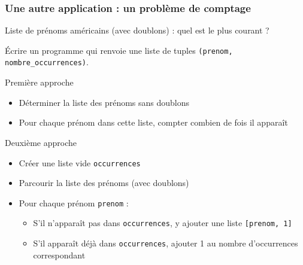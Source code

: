 \documentclass[x11names,svgnames]{beamer}
\begin{document}
\begin{frame}
  \frametitle{Une autre application : un problème de comptage}
  
  Liste de prénoms américains (avec doublons) : quel est le plus courant ?

  \MVRightarrow{} Écrire un programme qui renvoie une liste de tuples \texttt{(prenom, nombre_occurrences)}.

  \vspace{-1em}

  \pause

  \begin{overprint}
    \begin{block}{Première approche}
      \vspace{0.5em}
    \begin{itemize}
    \item Déterminer la liste des prénoms sans doublons
    \item Pour chaque prénom dans cette liste, compter combien de fois il apparaît
    \end{itemize}
  \end{block}
  \begin{block}{Deuxième approche}
    \vspace{0.5em}
    \begin{itemize}
    \item Créer une liste vide \texttt{occurrences}
    \item Parcourir la liste des prénoms (avec doublons)
    \item Pour chaque prénom \texttt{prenom} :
      \begin{itemize}
      \item S'il n'apparaît pas dans \texttt{occurrences}, y ajouter une liste \texttt{[prenom, 1]}
      \item S'il apparaît déjà dans \texttt{occurrences}, ajouter 1 au nombre d'occurrences correspondant
      \end{itemize}
    \end{itemize}
  \end{block}
\end{overprint}
\end{frame}
\end{document}
